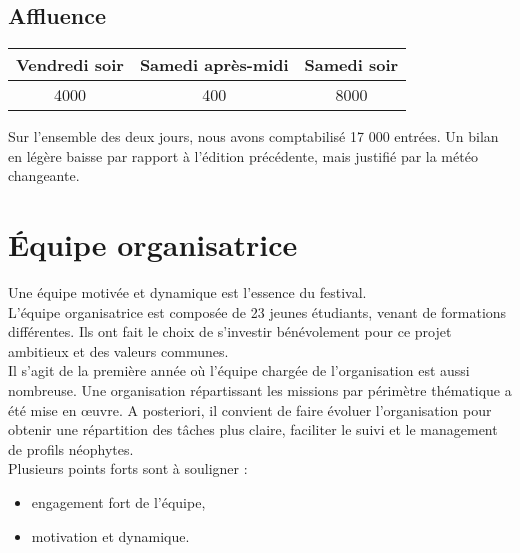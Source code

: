 \documentclass[12pt,a4paper]{report}
\begin{document}
\section{Affluence}
\begin{center}
\begin{tabular}{|c|c|c|}
Vendredi soir & Samedi après-midi & Samedi soir \\
\hline
4000 & 400 & 8000\\
\end{tabular}
\end{center}

Sur l'ensemble des deux jours, nous avons comptabilisé 17 000 entrées. Un bilan en légère baisse par rapport à l'édition précédente, mais justifié par la météo changeante.


\chapter{Équipe organisatrice}

Une équipe motivée et dynamique est l'essence du festival.\\

L’équipe organisatrice est composée de 23 jeunes étudiants, venant de formations différentes. Ils ont fait le choix de s’investir bénévolement pour ce projet ambitieux et des valeurs communes.\\

Il s'agit de la première année où l'équipe chargée de l'organisation est aussi nombreuse. Une organisation répartissant les missions par périmètre thématique a été mise en œuvre. A posteriori, il convient de faire évoluer l'organisation pour obtenir une répartition des tâches plus claire, faciliter le suivi et le management de profils néophytes.\\

Plusieurs points forts sont à souligner : 
\begin{itemize}
\item engagement fort de l'équipe,
\item motivation et dynamique.\\
\end{itemize}
\end{document}
